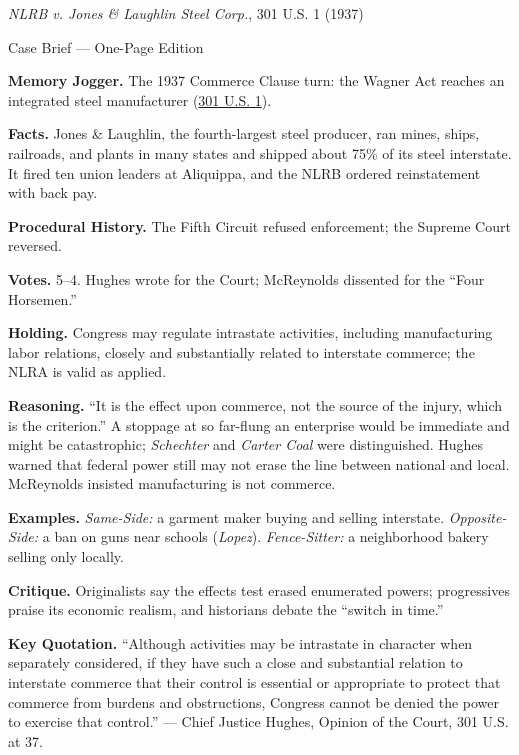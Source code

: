 \documentclass[12pt]{article}
\begin{document}
\begin{center}
{\Large \textit{NLRB v. Jones \& Laughlin Steel Corp.}, 301 U.S. 1 (1937)\par}
\vspace{0.3em}
{\normalsize Case Brief --- One-Page Edition\par}
\end{center}

\textbf{Memory Jogger.} The 1937 Commerce Clause turn: the Wagner Act reaches an integrated steel manufacturer (\href{https://supreme.justia.com/cases/federal/us/301/1/}{301 U.S. 1}).

\textbf{Facts.} Jones \& Laughlin, the fourth-largest steel producer, ran mines, ships, railroads, and plants in many states and shipped about 75\% of its steel interstate. It fired ten union leaders at Aliquippa, and the NLRB ordered reinstatement with back pay.

\textbf{Procedural History.} The Fifth Circuit refused enforcement; the Supreme Court reversed.

\textbf{Votes.} 5--4. Hughes wrote for the Court; McReynolds dissented for the ``Four Horsemen.''

\textbf{Holding.} Congress may regulate intrastate activities, including manufacturing labor relations, closely and substantially related to interstate commerce; the NLRA is valid as applied.

\textbf{Reasoning.} ``It is the effect upon commerce, not the source of the injury, which is the criterion.'' A stoppage at so far-flung an enterprise would be immediate and might be catastrophic; \textit{Schechter} and \textit{Carter Coal} were distinguished. Hughes warned that federal power still may not erase the line between national and local. McReynolds insisted manufacturing is not commerce.

\textbf{Examples.} \emph{Same-Side:} a garment maker buying and selling interstate. \emph{Opposite-Side:} a ban on guns near schools (\textit{Lopez}). \emph{Fence-Sitter:} a neighborhood bakery selling only locally.

\textbf{Critique.} Originalists say the effects test erased enumerated powers; progressives praise its economic realism, and historians debate the ``switch in time.''

\textbf{Key Quotation.} ``Although activities may be intrastate in character when separately considered, if they have such a close and substantial relation to interstate commerce that their control is essential or appropriate to protect that commerce from burdens and obstructions, Congress cannot be denied the power to exercise that control.'' --- Chief Justice Hughes, Opinion of the Court, 301 U.S. at 37.
\end{document}
